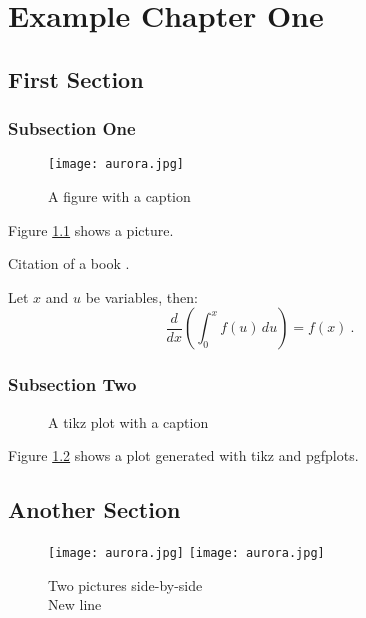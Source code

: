 \chapter{Example Chapter One}

\section{First Section}

\subsection{Subsection One}

\begin{figure}
  \centering
  \texttt{[image: aurora.jpg]}
  \caption{A figure with a caption}
  \label{fig:aurora}
\end{figure}

Figure \ref{fig:aurora} shows a picture.

Citation of a book \cite{hartley2004}.

Let $x$ and $u$ be variables, then:
\begin{equation}
  \frac{d}{dx} \left( \int_{0}^{x} f(u)\,du \right) = f(x) ~.
\end{equation}

\lipsum[1-2]

\subsection{Subsection Two}

\begin{figure}
  \centering
  
  \caption{A tikz plot with a caption}
  \label{fig:plot}
\end{figure}

Figure \ref{fig:plot} shows a plot generated with tikz and pgfplots.

\lipsum[4-5]

\section{Another Section}

\begin{figure}[h]
  \centering
  {\texttt{[image: aurora.jpg]}}
  \label{fig:subcaption_1}
  \hfill
  {\texttt{[image: aurora.jpg]}}
  \label{fig:subcaption_2}
  \caption{Two pictures side-by-side
    \protect\\ %
    New line}
  \label{fig:subcaption}
\end{figure}

